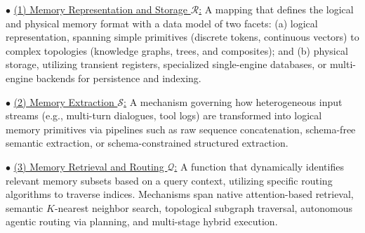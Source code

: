 
\noindent $\bullet$ \underline{(1) Memory Representation and Storage $\mathcal{R}$:} A mapping that defines the logical and physical memory format with a data model of two facets: (a) logical representation, spanning simple primitives (discrete tokens, continuous vectors) to complex topologies (knowledge graphs, trees, and composites); and (b) physical storage, utilizing transient registers, specialized single-engine databases, or multi-engine backends for persistence and indexing.

\noindent $\bullet$ \underline{(2) Memory Extraction $\mathcal{S}$:} A mechanism governing how heterogeneous input streams (e.g., multi-turn dialogues, tool logs) are transformed into logical memory primitives via pipelines such as raw sequence concatenation, schema-free semantic extraction, or schema-constrained structured extraction.

\noindent $\bullet$ \underline{(3) Memory Retrieval and Routing $\mathcal{Q}$:} A function that dynamically identifies relevant memory subsets based on a query context, utilizing specific routing algorithms to traverse indices. Mechanisms span native attention-based retrieval, semantic $K$-nearest neighbor search, topological subgraph traversal, autonomous agentic routing via \llm planning, and multi-stage hybrid execution.

